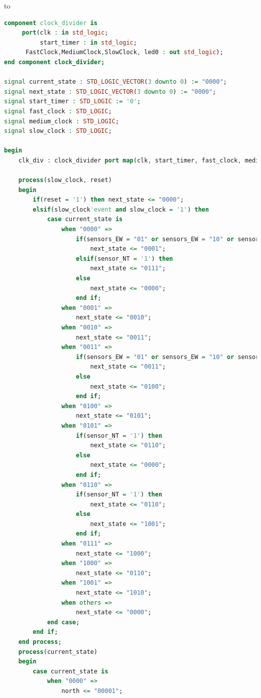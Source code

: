 to\documentclass[11pt]{article}
\begin{document}
\begin{appendices}
\begin{lstlisting}[language=VHDL]
component clock_divider is
     port(clk : in std_logic;
          start_timer : in std_logic;
	  FastClock,MediumClock,SlowClock, led0 : out std_logic);
end component clock_divider;

signal current_state : STD_LOGIC_VECTOR(3 downto 0) := "0000";
signal next_state : STD_LOGIC_VECTOR(3 downto 0) := "0000";
signal start_timer : STD_LOGIC := '0';
signal fast_clock : STD_LOGIC;
signal medium_clock : STD_LOGIC;
signal slow_clock : STD_LOGIC;

begin
    clk_div : clock_divider port map(clk, start_timer, fast_clock, medium_clock, slow_clock, clock_led);
    
    process(slow_clock, reset)
    begin
        if(reset = '1') then next_state <= "0000";
        elsif(slow_clock'event and slow_clock = '1') then
            case current_state is
                when "0000" =>
                    if(sensors_EW = "01" or sensors_EW = "10" or sensors_EW = "11") then
                        next_state <= "0001";
                    elsif(sensor_NT = '1') then 
                        next_state <= "0111";
                    else
                        next_state <= "0000";
                    end if;
                when "0001" =>
                    next_state <= "0010";
                when "0010" =>
                    next_state <= "0011";
                when "0011" =>
                    if(sensors_EW = "01" or sensors_EW = "10" or sensors_EW = "11") then
                        next_state <= "0011";
                    else
                        next_state <= "0100";
                    end if;
                when "0100" =>
                    next_state <= "0101";
                when "0101" =>
                    if(sensor_NT = '1') then
                        next_state <= "0110";
                    else
                        next_state <= "0000";
                    end if;
                when "0110" =>
                    if(sensor_NT = '1') then
                        next_state <= "0110";
                    else
                        next_state <= "1001";
                    end if;
                when "0111" =>
                    next_state <= "1000";
                when "1000" =>
                    next_state <= "0110";
                when "1001" =>
                    next_state <= "1010";
                when others =>
                    next_state <= "0000";
            end case;
        end if;
    end process;
    process(current_state)
    begin
        case current_state is
            when "0000" =>
                north <= "00001";

\end{lstlisting}
\end{appendices}
\end{document}
